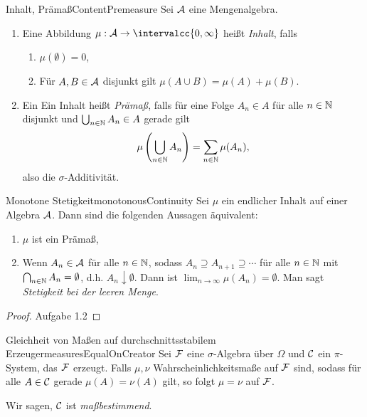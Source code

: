 \documentclass[language=ngerman]{../../Template/TemplateLecture}
\begin{document}
\begin{defi}{Inhalt, Prämaß}{ContentPremeasure}
    Sei $\mathcal{A}$ eine Mengenalgebra. 
    \begin{enumerate}[$(i)$]
        \item Eine Abbildung $\mu: \cA \to \intervalcc{0,\infty}$ heißt \emph{Inhalt}, falls
        \begin{enumerate}[(\greek*)]
            \item $\mu(\emptyset) = 0$,
            \item Für $A, B \in \mathcal{A}$ disjunkt gilt $\mu(A \cup B) = \mu(A) + \mu(B)$.
        \end{enumerate}
        \item Ein Ein Inhalt heißt \emph{Prämaß}, falls für eine Folge $A_n \in A$ für alle $n \in \mathbb{N}$ disjunkt und $\bigcup_{n \in \mathbb{N}} A_n \in A$ gerade gilt 
        \begin{equation}
            \mu\left(\bigcup_{n \in \mathbb{N}} A_n\right) = \sum_{n \in \mathbb{N}} \mu(A_n),
        \end{equation}
        also die $\sigma$-Additivität.
    \end{enumerate}
\end{defi}

\begin{lem}{Monotone Stetigkeit}{monotonousContinuity}
    Sei $\mu$ ein endlicher Inhalt auf einer Algebra $\mathcal{A}$. Dann sind die folgenden Aussagen äquivalent:
    \begin{enumerate}[$(i)$]
        \item $\mu$ ist ein Prämaß,
        \item Wenn $A_n \in \mathcal{A}$ für alle $n \in \mathbb{N}$, sodass $A_n \supseteq A_{n+1} \supseteq \cdots$ für alle $n \in \mathbb{N}$ mit $\bigcap_{n \in \mathbb{N}} A_n = \emptyset$, d.h. $A_n \downarrow \emptyset$. Dann ist $\lim_{n \to \infty} \mu(A_n) = \emptyset$. Man sagt \emph{Stetigkeit bei der leeren Menge}.
    \end{enumerate}
\end{lem}
\begin{proof}
    Aufgabe 1.2
\end{proof}

\begin{thm}{Gleichheit von Maßen auf durchschnittsstabilem Erzeuger}{measuresEqualOnCreator}
    Sei $\mathcal{F}$ eine $\sigma$-Algebra über $\Omega$ und $\mathcal{C}$ ein $\pi$-System, das $\mathcal{F}$ erzeugt. Falls $\mu, \nu$ Wahrscheinlichkeitsmaße auf $\mathcal{F}$ sind, sodass für alle $A \in \mathcal{C}$ gerade $\mu(A) = \nu(A)$ gilt, so folgt $\mu = \nu$ auf $\mathcal{F}$.
\end{thm}
Wir sagen, $\mathcal{C}$ ist \emph{maßbestimmend}.
\end{document}
